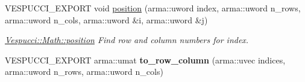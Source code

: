 \begin{DoxyCompactItemize}
V\+E\+S\+P\+U\+C\+C\+I\+\_\+\+E\+X\+P\+O\+RT void \hyperlink{namespace_vespucci_1_1_math_a62f5e835cad1e15513494a5a48e028ae}{position} (arma\+::uword index, arma\+::uword n\+\_\+rows, arma\+::uword n\+\_\+cols, arma\+::uword \&i, arma\+::uword \&j)
\begin{DoxyCompactList}\small\item\em \hyperlink{namespace_vespucci_1_1_math_a62f5e835cad1e15513494a5a48e028ae}{Vespucci\+::\+Math\+::position} Find row and column numbers for index. \end{DoxyCompactList}\item 
V\+E\+S\+P\+U\+C\+C\+I\+\_\+\+E\+X\+P\+O\+RT arma\+::umat {\bfseries to\+\_\+row\+\_\+column} (arma\+::uvec indices, arma\+::uword n\+\_\+rows, arma\+::uword n\+\_\+cols)\hypertarget{namespace_vespucci_1_1_math_a114f5bdc75f1c911ccf1d6e8652d6cfa}{}\label{namespace_vespucci_1_1_math_a114f5bdc75f1c911ccf1d6e8652d6cfa}


\end{DoxyCompactItemize}
